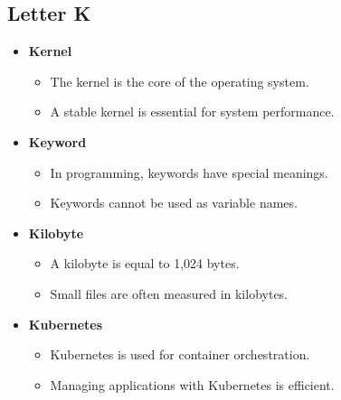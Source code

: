     \subsection{Letter K}
    \begin{itemize}
        \item \textbf{Kernel}
        \begin{itemize}
            \item The kernel is the core of the operating system.
            \item A stable kernel is essential for system performance.
        \end{itemize}
        \item \textbf{Keyword}
        \begin{itemize}
            \item In programming, keywords have special meanings.
            \item Keywords cannot be used as variable names.
        \end{itemize}
        \item \textbf{Kilobyte}
        \begin{itemize}
            \item A kilobyte is equal to 1,024 bytes.
            \item Small files are often measured in kilobytes.
        \end{itemize}
        \item \textbf{Kubernetes}
        \begin{itemize}
            \item Kubernetes is used for container orchestration.
            \item Managing applications with Kubernetes is efficient.
        \end{itemize}
    \end{itemize}

